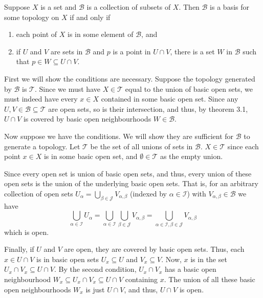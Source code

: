 \documentclass[12 pt, letterpaper]{hmcpset}
\begin{document}
\pagebreak

\begin{problem}[3.3]
	Suppose $X$ is a set and $\mathcal{B}$ is a collection of subsets of $X$. Then $\mathcal{B}$ is a basis for some topology on $X$ if and only if
	\begin{enumerate}
		\item each point of $X$ is in some element of $\mathcal{B}$, and
		\item if $U$ and $V$ are sets in $\mathcal{B}$ and $p$ is a point in $U \cap V$, there is a set $W$ in $\mathcal{B}$ such that $p \in W \subseteq U \cap V$.
	\end{enumerate}
\end{problem}

\begin{solution}
	First we will show the conditions are necessary. Suppose the topology generated by $\mathcal{B}$ is $\mathcal{T}$. Since we must have $X \in \mathcal{T}$ equal to the union of basic open sets, we must indeed have every $x \in X$ contained in some basic open set. Since any $U, V \in \mathcal{B} \subseteq \mathcal{T}$ are open sets, so is their intersection, and thus, by theorem 3.1, $U \cap V$ is covered by basic open neighbourhoods $W \in \mathcal{B}$.

	Now suppose we have the conditions. We will show they are sufficient for $\mathcal{B}$ to generate a topology. Let $\mathcal{T}$ be the set of all unions of sets in $\mathcal{B}$. $X \in \mathcal{T}$ since each point $x \in X$ is in some basic open set, and $\emptyset \in \mathcal{T}$ as the empty union. 

	Since every open set is union of basic open sets, and thus, every union of these open sets is the union of the underlying basic open sets. That is, for an arbitrary collection of open sets $U_{\alpha} = \bigcup_{\beta \in \mathcal{J}} V_{\alpha, \beta}$ (indexed by $\alpha \in \mathcal{I}$) with $V_{\alpha, \beta} \in \mathcal{B}$ we have
	\[
		\bigcup_{\alpha \in \mathcal{I}} U_{\alpha} = \bigcup_{\alpha \in \mathcal{I}} \bigcup_{\beta \in \mathcal{J}} V_{\alpha, \beta} = \bigcup_{\alpha \in \mathcal{I}, \beta \in \mathcal{J}} V_{\alpha, \beta}
	\]
	which is open.

	Finally, if $U$ and $V$ are open, they are covered by basic open sets. Thus, each $x \in U \cap V$ is in basic open sets $U_{x} \subseteq U$ and $V_{x} \subseteq V$. Now, $x$ is in the set $U_{x} \cap V_{x} \subseteq U \cap V$. By the second condition, $U_{x} \cap V_{x}$ has a basic open neighbourhood $W_{x} \subseteq U_{x} \cap V_{x} \subseteq U \cap V$ containing $x$. The union of all these basic open neighbourhoods $W_{x}$ is just $U \cap V$, and thus, $U \cap V$ is open.
\end{solution}
\end{document}
